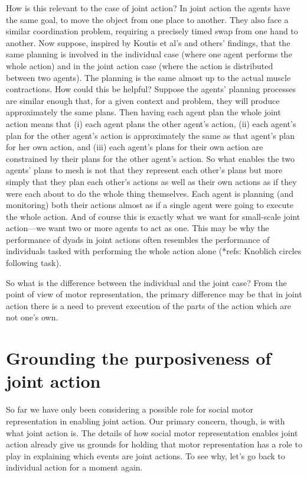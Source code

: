 \documentclass[12pt,\papersize]{extarticle}
\begin{document}
How is this relevant to the case of joint action?
In joint action the agents have the same goal, to move the object from one place to another.
They also face a similar coordination problem, requiring a precisely timed swap from one hand to another.
Now suppose, 
inspired by Koutis et al’s and others' findings,
that the same planning is involved in the individual case (where one agent performs the whole action) and in the joint action case (where the action is distributed between two agents).
The planning is the same almost up to the actual muscle contractions.
How could this be helpful?
Suppose the agents' planning processes are similar enough that, for a given context and problem, they will produce approximately the same plans.
Then having each agent plan the whole joint action means that (i) each agent plans the other agent's action,
(ii) each agent's plan for the other agent's action is approximately the same as that agent's plan for her own action,
and 
(iii) each  agent's plans for their own action are constrained by their plans for the other agent's action.
So what enables the two agents' plans to mesh is not that they represent each other's plans but more simply that they plan each other's actions as well as their own actions as if they were each about to do the whole thing themselves.
Each agent is planning (and monitoring) both their actions almost as if a single agent were going to execute the whole action.
And of course this is exactly what we want for small-scale joint action---we want two or more agents to act as one.
This may be why the performance of dyads in joint actions often resembles the performance of individuals tasked with performing the whole action alone (*refs: Knoblich circles following task).

So what is the difference between the individual and the joint case?  From the point of view of motor representation, the primary difference may be that in joint action there is a need to prevent execution of the parts of the action which are not one’s own.



\section{Grounding the purposiveness of joint action}
So far we have only been considering a possible role for social motor representation in enabling joint action.  
Our primary concern, though, is with what joint action is.
The details of how 
social motor representation enables joint action
 already give us grounds for holding that motor representation has a role to play in explaining which events are joint actions.
To see why,
let’s go back to individual action for a moment again.
\end{document}
